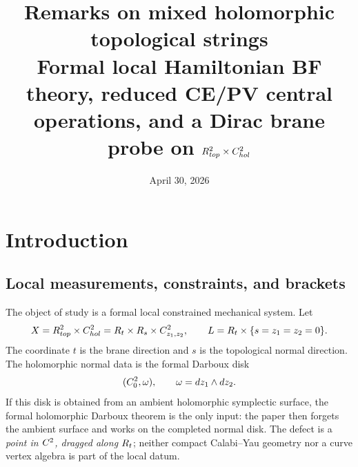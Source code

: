\documentclass[11pt]{memoir}
\title{\texorpdfstring{Remarks on mixed holomorphic topological strings\\
\large Formal local Hamiltonian BF theory, reduced CE/PV central operations, and a Dirac brane probe on \(R^2_{top}\times C^2_{hol}\)}
{Remarks on mixed holomorphic topological strings:
Formal local Hamiltonian BF theory, reduced CE/PV central operations, and a Dirac brane probe on R2 top x C2 hol}}
\date{April 30, 2026}
\begin{document}

  \maketitle
  
  \tableofcontents
  \mbox{}

\section{Introduction}

\subsection{Local measurements, constraints, and brackets}

The object of study is a formal local constrained mechanical system. Let
\[
  X=R^2_{top}\times C^2_{hol}
    =R_t\times R_s\times C^2_{z_1,z_2},
  \qquad
  L=R_t\times\{s=z_1=z_2=0\}.
\]
The coordinate \(t\) is the brane direction and \(s\) is the topological
normal direction.  The holomorphic normal data is the formal Darboux disk
\[
  (C^2_{0},\omega),\qquad \omega=dz_1\wedge dz_2 .
\]
If this disk is obtained from an ambient holomorphic symplectic surface,
the formal holomorphic Darboux theorem is the only input: the paper then
forgets the ambient surface and works on the completed normal disk.  The
defect is a \emph{point in \(C^2\), dragged along \(R_t\)}; neither
compact Calabi--Yau geometry nor a curve vertex algebra is part of the
local datum.
\end{document}
